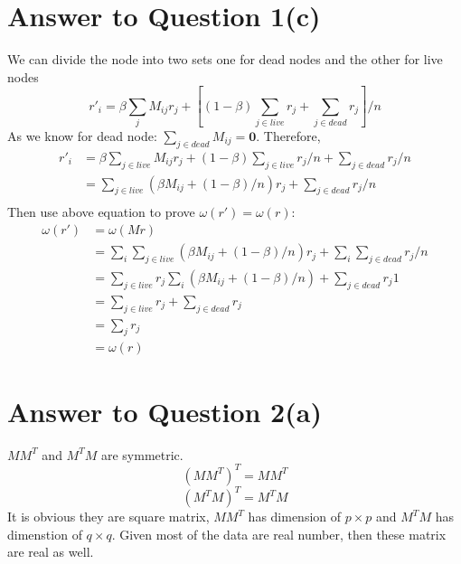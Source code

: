 \documentclass[11pt]{article}
\begin{document}
\section*{Answer to Question 1(c)}
We can divide the node into two sets one for dead nodes and the other for live nodes
\begin{equation*}
    r'_i = \beta\sum_j M_{ij}r_j + [(1-\beta)\sum_{j\in live}r_j + \sum_{j\in dead}r_j]/n
\end{equation*}
As we know for dead node: $\sum_{j\in dead} M_{ij} = \mathbf{0}$. Therefore,
\begin{equation}
\begin{aligned}
    r'_i & = \beta\sum_{j\in live} M_{ij}r_j + (1-\beta)\sum_{j\in live}r_j/n + \sum_{j\in dead}r_j/n\\
    & = \sum_{j\in live}(\beta M_{ij} + (1-\beta)/n)r_j + \sum_{j\in dead}r_j/n\\
\end{aligned}
\end{equation}
Then use above equation to prove $\omega(r') = \omega(r)$:
\begin{equation}
\begin{aligned}
    \omega(r') & = \omega(Mr)\\
    & = \sum_i\sum_{j\in live}(\beta M_{ij} + (1-\beta)/n)r_j + \sum_i\sum_{j\in dead}r_j/n\\
    & = \sum_{j\in live}r_j\sum_i(\beta M_{ij} + (1-\beta)/n) + \sum_{j\in dead}r_j1\\
    & = \sum_{j\in live}r_j + \sum_{j\in dead}r_j\\
    & = \sum_jr_j\\
    & = \omega(r)
\end{aligned}
\end{equation}

\pagebreak[4]
\section*{Answer to Question 2(a)}
$MM^T$ and $M^TM$ are symmetric.
$$(MM^T)^T = MM^T$$
$$(M^TM)^T = M^TM$$
It is obvious they are square matrix, $MM^T$ has dimension of $p \times p$ and $M^TM$ has dimenstion of $q \times q$.
Given most of the data are real number, then these matrix are real as well.

\pagebreak[4]
\end{document}

